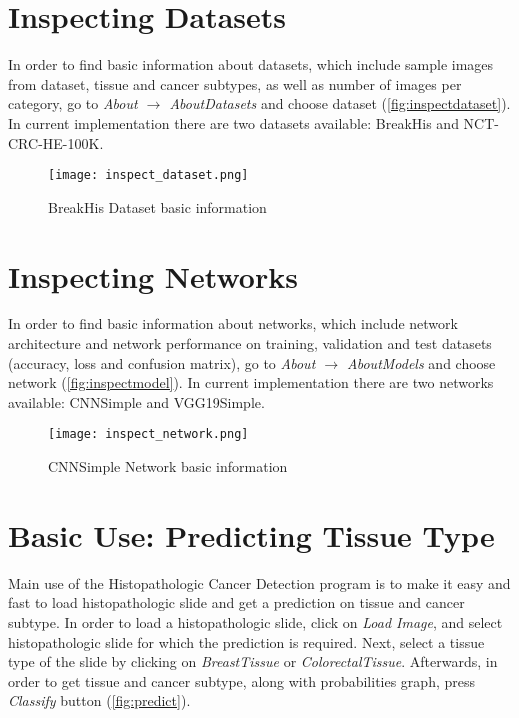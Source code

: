 \section{Inspecting Datasets}
\label{inspdata}

In order to find basic information about datasets, which include sample images from dataset, tissue and cancer subtypes, as well as number of images per category, go to \emph{About $\rightarrow$ About\;Datasets} and choose dataset (\textcolor{red}{\autoref{fig:inspectdataset}}). In current implementation there are two datasets available: BreakHis and NCT-CRC-HE-100K.

\begin{figure}[h]
	\centering
	\texttt{[image: inspect\_dataset.png]}
	\caption{BreakHis Dataset basic information}
	\label{fig:inspectdataset}
\end{figure}

\section{Inspecting Networks}
\label{inspnets}

In order to find basic information about networks, which include network architecture and network performance on training, validation and test datasets (accuracy, loss and confusion matrix), go to \emph{About $\rightarrow$ About\;Models} and choose network (\textcolor{red}{\autoref{fig:inspectmodel}}). In current implementation there are two networks available: CNNSimple and VGG19Simple.
\clearpage

\begin{figure}[h]
	\centering
	\texttt{[image: inspect\_network.png]}
	\caption{CNNSimple Network basic information}
	\label{fig:inspectmodel}
\end{figure}

\section{Basic Use: Predicting Tissue Type}
\label{basicuse}

Main use of the Histopathologic Cancer Detection program is to make it easy and fast to load histopathologic slide and get a prediction on tissue and cancer subtype. In order to load a histopathologic slide, click on \emph{Load\; Image}, and select histopathologic slide for which the prediction is required. Next, select a tissue type of the slide by clicking on \emph{Breast\;Tissue} or \emph{Colorectal\;Tissue}. Afterwards, in order to get tissue and cancer subtype, along with probabilities graph, press \emph{Classify} button (\textcolor{red}{\autoref{fig:predict}}).

